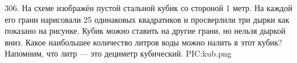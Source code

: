 306. На схеме изображён пустой стальной кубик со стороной 1 метр. На каждой его грани нарисовали 25 одинаковых квадратиков и просверлили три дырки как показано на рисунке. Кубик можно ставить на другие грани, но нельзя дыркой вниз. Какое наибольшее количество литров воды можно налить в этот кубик? Напомним, что литр --- это дециметр кубический.
{{PIC:kub.png}}\\
